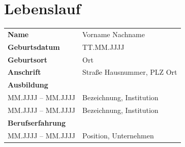 \chapter*{Lebenslauf}
\thispagestyle{empty}

\begin{tabular}{ll}
\textbf{Name}           & Vorname Nachname \\[1ex]
\textbf{Geburtsdatum}   & TT.MM.JJJJ \\[1ex]
\textbf{Geburtsort}     & Ort \\[1ex]
\textbf{Anschrift}      & Straße Hausnummer, PLZ Ort \\[3ex]

\multicolumn{2}{l}{\textbf{Ausbildung}} \\[1ex]
MM.JJJJ -- MM.JJJJ     & Bezeichnung, Institution \\[1ex]
MM.JJJJ -- MM.JJJJ     & Bezeichnung, Institution \\[3ex]

\multicolumn{2}{l}{\textbf{Berufserfahrung}} \\[1ex]
MM.JJJJ -- MM.JJJJ     & Position, Unternehmen \\[1ex]
\end{tabular}
